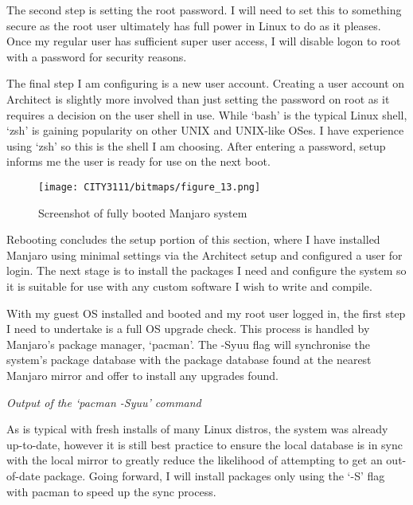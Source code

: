 The second step is setting the root password. I will need to set this to something secure as the root user ultimately has full power in Linux to do as it pleases. Once my regular user has sufficient super user access, I will disable logon to root with a password for security reasons.

The final step I am configuring is a new user account. Creating a user account on Architect is slightly more involved than just setting the password on root as it requires a decision on the user shell in use. While `bash' is the typical Linux shell, `zsh' is gaining popularity on other UNIX and UNIX-like OSes. I have experience using `zsh' so this is the shell I am choosing. After entering a password, setup informs me the user is ready for use on the next boot.

\begin{figure}[H]
    \texttt{[image: CITY3111/bitmaps/figure\_13.png]}
    \caption{Screenshot of fully booted Manjaro system}
    \label{figure_13}
\end{figure}

Rebooting concludes the setup portion of this section, where I have installed Manjaro using minimal settings via the Architect setup and configured a user for login. The next stage is to install the packages I need and configure the system so it is suitable for use with any custom software I wish to write and compile.

\textbf{}

With my guest OS installed and booted and my root user logged in, the first step I need to undertake is a full OS upgrade check. This process is handled by Manjaro's package manager, `pacman'. The -Syuu flag will synchronise the system's package database with the package database found at the nearest Manjaro mirror and offer to install any upgrades found.


\begin{center}
    \emph{Output of the `pacman -Syuu' command}
\end{center}

As is typical with fresh installs of many Linux distros, the system was already up-to-date, however it is still best practice to ensure the local database is in sync with the local mirror to greatly reduce the likelihood of attempting to get an out-of-date package. Going forward, I will install packages only using the `-S' flag with pacman to speed up the sync process.

